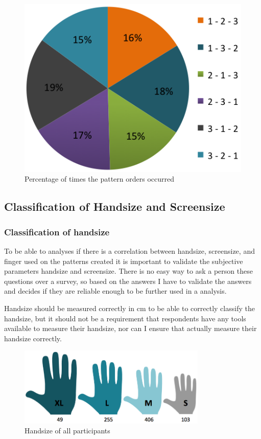 		\begin{figure}[H]
      \centering
      \includegraphics[scale=0.5]{pics/analysis/patternOrder.png}
      \caption{Percentage of times the pattern orders occurred}
      \label{fig:patternOrder}
    \end{figure}

  \subsection{Classification of Handsize and Screensize} \label{sec:classificationhandsizescreensize}

    \subsubsection*{Classification of handsize}
    To be able to analyses if there is a correlation between handsize, screensize, and finger used on the patterns created it is important to validate the subjective parameters handsize and screensize. There is no easy way to ask a person these questions over a survey, so based on the answers I have to validate the answers and decides if they are reliable enough to be further used in a analysis. 

    Handsize should be measured correctly in cm to be able to correctly classify the handsize, but it should not be a requirement that respondents have any tools available to measure their handsize, nor can I ensure that actually measure their handsize correctly. 


		\begin{figure}[H]
      \centering
      \includegraphics[width=0.8\textwidth]{pics/analysis/handsize.png}
      \caption{Handsize of all participants}
      \label{fig:handsize}
    \end{figure}

